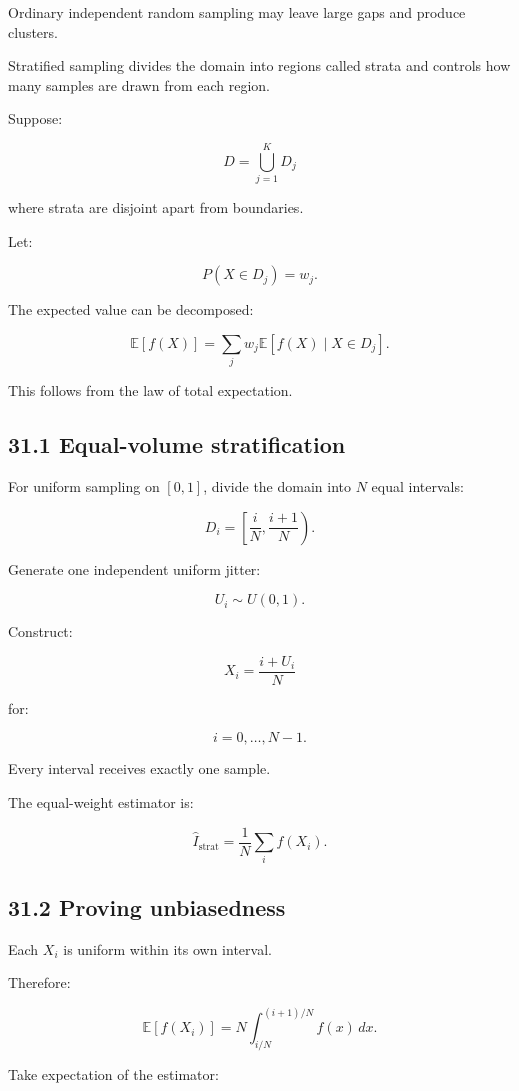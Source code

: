 Ordinary independent random sampling may leave large gaps and produce clusters.

Stratified sampling divides the domain into regions called strata and controls how many samples are drawn from each region.

Suppose:

\[ D=\bigcup_{j=1}^{K}D_j \]

where strata are disjoint apart from boundaries.

Let:

\[ P(X\in D_j)=w_j. \]

The expected value can be decomposed:

\[ \mathbb E[f(X)] = \sum_jw_j\mathbb E[f(X)\mid X\in D_j]. \]

This follows from the law of total expectation.

\subsection{31.1 Equal-volume stratification}\label{02-foundations-ii-ch031-equal-volume-stratification}

For uniform sampling on \([0,1]\), divide the domain into \(N\) equal intervals:

\[ D_i= \left[\frac iN,\frac{i+1}{N}\right). \]

Generate one independent uniform jitter:

\[ U_i\sim U(0,1). \]

Construct:

\[ \boxed{ X_i=\frac{i+U_i}{N} } \]

for:

\[ i=0,\ldots,N-1. \]

Every interval receives exactly one sample.

The equal-weight estimator is:

\[ \boxed{ \widehat I_{\mathrm{strat}} = \frac1N\sum_i f(X_i) }. \]

\subsection{31.2 Proving unbiasedness}\label{02-foundations-ii-ch031-proving-unbiasedness}

Each \(X_i\) is uniform within its own interval.

Therefore:

\[ \mathbb E[f(X_i)] = N\int_{i/N}^{(i+1)/N}f(x)\,dx. \]

Take expectation of the estimator:

